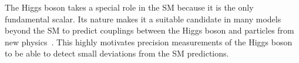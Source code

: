 The Higgs boson takes a special role in the SM because it is the only fundamental scalar. Its nature makes it a suitable candidate in many models beyond the SM to predict couplings between the Higgs boson and particles from new physics~\cite{2019BHeinemann}.
This highly motivates precision measurements of the Higgs boson to be able to detect small deviations from the SM predictions. 



